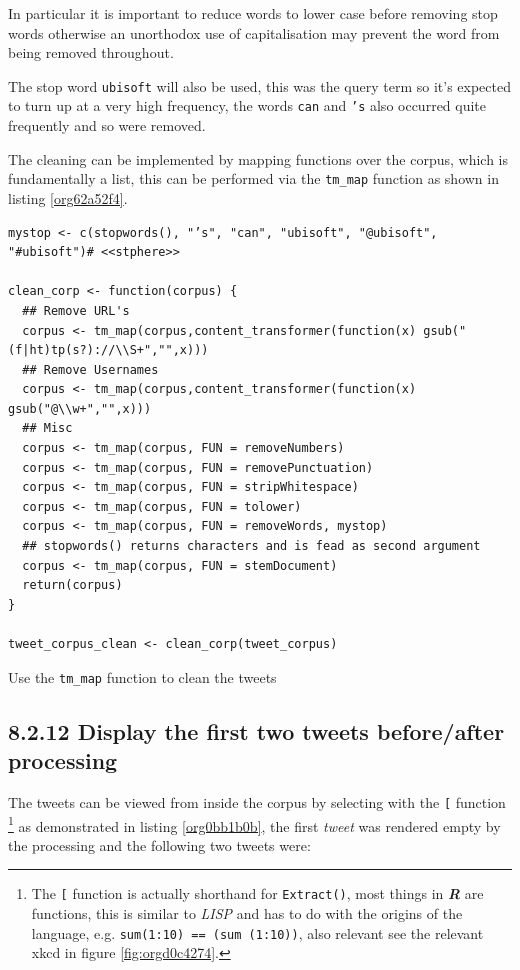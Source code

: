 \documentclass[11pt]{article}
\begin{document}
In particular it is important to reduce words to lower case before removing stop words otherwise an unorthodox use of capitalisation may prevent the word from being removed throughout.

The stop word \texttt{ubisoft} will also be used, this was the query term so it's expected to turn up at a very high frequency, the words \texttt{can} and \texttt{'s} also occurred quite frequently and so were removed.

The cleaning can be implemented by mapping functions over the corpus, which is fundamentally a list, this can be performed via the \texttt{tm\_map} function as shown in listing \ref{org62a52f4}.



\begin{listing}[htbp]
\begin{verbatim}
mystop <- c(stopwords(), "’s", "can", "ubisoft", "@ubisoft", "#ubisoft")# <<stphere>>

clean_corp <- function(corpus) {
  ## Remove URL's
  corpus <- tm_map(corpus,content_transformer(function(x) gsub("(f|ht)tp(s?)://\\S+","",x)))
  ## Remove Usernames
  corpus <- tm_map(corpus,content_transformer(function(x) gsub("@\\w+","",x)))
  ## Misc
  corpus <- tm_map(corpus, FUN = removeNumbers)
  corpus <- tm_map(corpus, FUN = removePunctuation)
  corpus <- tm_map(corpus, FUN = stripWhitespace)
  corpus <- tm_map(corpus, FUN = tolower)
  corpus <- tm_map(corpus, FUN = removeWords, mystop)
  ## stopwords() returns characters and is fead as second argument
  corpus <- tm_map(corpus, FUN = stemDocument)
  return(corpus)
}

tweet_corpus_clean <- clean_corp(tweet_corpus)
\end{verbatim}
\caption{\label{org62a52f4}Use the \texttt{tm\_map} function to clean the tweets}
\end{listing}

\subsection{8.2.12 Display the first two tweets before/after processing}
\label{sec:orge21fc16}
The tweets can be viewed from inside the corpus by selecting with the \texttt{[} function \footnote{The \texttt{[} function is actually shorthand for \texttt{Extract()}, most things in
\textbf{\emph{R}} are functions, this is similar to \emph{LISP} and has to do with the origins of
the language, e.g. \texttt{sum(1:10) == (sum (1:10))}, also relevant see the relevant
xkcd in figure \ref{fig:orgd0c4274}.} as demonstrated in listing \ref{org0bb1b0b}, the first \emph{tweet} was rendered empty by the processing and the following two tweets were:
\end{document}
